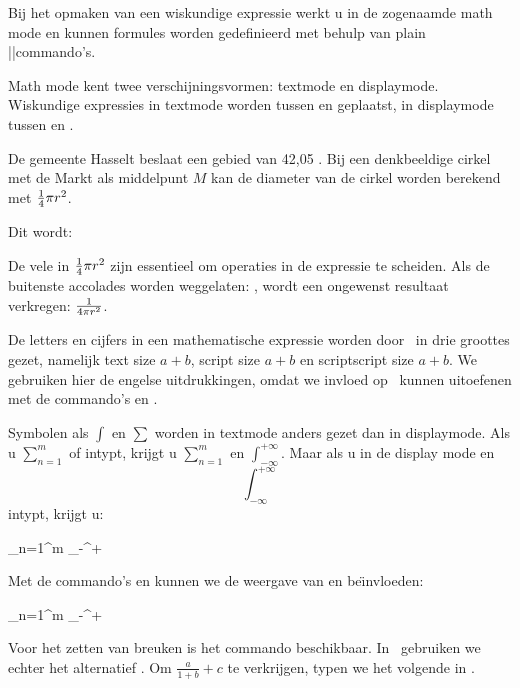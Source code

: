 \stopopsomming

Bij het opmaken van een wiskundige expressie werkt u in de
zogenaamde math mode en kunnen formules worden gedefinieerd
met behulp van plain \TEX||commando's.

Math mode kent twee verschijningsvormen: textmode en
displaymode. Wiskundige expressies in textmode worden tussen
\type{$} en \type{$} geplaatst, in displaymode tussen
\type{$$} en \type{$$}.

\startbuffer
De gemeente Hasselt beslaat een gebied van 42,05 \Square
\Kilo \Meter. Bij een denkbeeldige cirkel met de Markt als
middelpunt $M$ kan de diameter van de cirkel worden
berekend met ${{1}\over{4}} \pi r^2$.
\stopbuffer

\typebuffer

Dit wordt:

\haalbuffer

De vele \type{{}} in ${{1}\over{4}} \pi r^2$ zijn essentieel
om operaties in de expressie te scheiden. Als de buitenste
accolades worden weggelaten: ,
wordt een ongewenst resultaat verkregen: ${1}\over{4} \pi
r^2$.

De letters en cijfers in een mathematische expressie worden
door \TEX\ in drie groottes gezet, namelijk
text size         $a+b$,
script size       $\scriptstyle a+b$ en
scriptscript size $\scriptscriptstyle a+b$.
We gebruiken hier de engelse uitdrukkingen, omdat we
invloed op \TEX\ kunnen uitoefenen met de commando's
\type{\scriptstyle} en \type{\scriptscriptstyle}.

Symbolen als $\int$ en $\sum$ worden in textmode
anders gezet dan in displaymode. Als u \type
{$\sum_{n=1}^{m}$} of \type {$\int_{-\infty}^{+\infty}$}
intypt, krijgt u {$\sum_{n=1}^{m}$} en
{$\int_{-\infty}^{+\infty}$}. Maar als u in de display
mode  en \type
{$$\int_{-\infty}^{+\infty}$$} intypt, krijgt u:

\startformule
\sum_{n=1}^{m}  \quad \int_{-\infty}^{+\infty}
\stopformule

Met de commando's \type {\nolimits} en \type{\limits}
kunnen we de weergave van \type{\sum} en \type{\int}
be\"{\i}nvloeden:

\startformule
\sum_{n=1}^{m}\nolimits {} \quad \int_{-\infty}^{+\infty}\limits
\stopformule

Voor het zetten van breuken is het commando \type
{\over} beschikbaar. In \CONTEXT\ gebruiken we echter het
alternatief \type {\frac}. Om ${\frac{a}{1+b}}+c$ te
verkrijgen, typen we het volgende in
.

